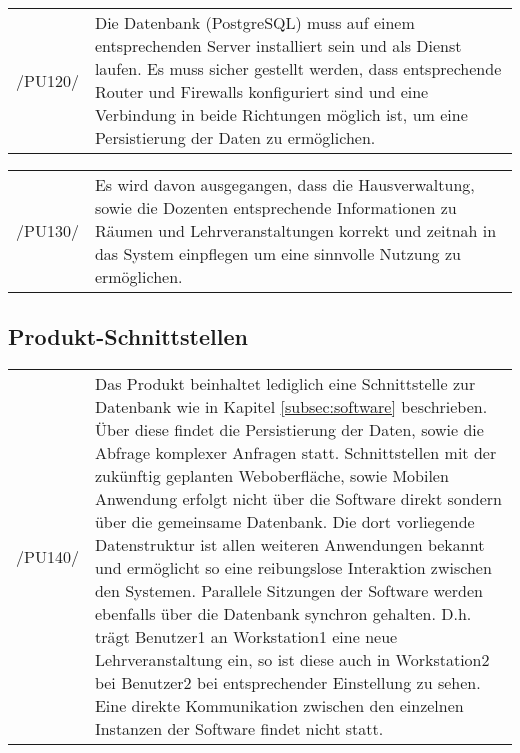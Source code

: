 \begin{tabular}{p{1.5cm}p{14.5cm}}

	 /PU120/	&  Die Datenbank (PostgreSQL) muss auf einem entsprechenden Server installiert sein und als Dienst laufen. Es muss sicher gestellt werden, dass entsprechende Router und Firewalls konfiguriert sind und eine Verbindung in beide Richtungen möglich ist, um eine Persistierung der Daten zu ermöglichen.\\[0.25cm]


\end{tabular}

\begin{tabular}{p{1.5cm}p{14.5cm}}

	 /PU130/	&  Es wird davon ausgegangen, dass die Hausverwaltung, sowie die Dozenten entsprechende Informationen zu Räumen und Lehrveranstaltungen korrekt und zeitnah in das System einpflegen um eine sinnvolle Nutzung zu ermöglichen.\\[0.25cm]


\end{tabular}




\subsection{Produkt-Schnittstellen}
\label{subsec:productinterface}

\begin{tabular}{p{1.5cm}p{14.5cm}}

	 /PU140/	&  Das Produkt beinhaltet lediglich eine Schnittstelle zur Datenbank wie in Kapitel \ref{subsec:software} beschrieben. Über diese findet die Persistierung der Daten, sowie die Abfrage komplexer Anfragen statt.
Schnittstellen mit der zukünftig geplanten Weboberfläche, sowie Mobilen Anwendung erfolgt nicht über die Software direkt sondern über die gemeinsame Datenbank. Die dort vorliegende Datenstruktur ist allen weiteren Anwendungen bekannt und ermöglicht so eine reibungslose Interaktion zwischen den Systemen.
Parallele Sitzungen der Software werden ebenfalls über die Datenbank synchron gehalten. D.h. trägt Benutzer1 an Workstation1 eine neue Lehrveranstaltung ein, so ist diese auch in Workstation2 bei Benutzer2 bei entsprechender Einstellung zu sehen. Eine direkte Kommunikation zwischen den einzelnen Instanzen der Software findet nicht statt.\\[0.25cm]


\end{tabular}



